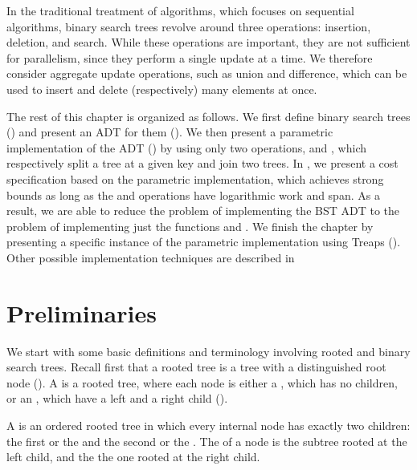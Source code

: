 \begin{chapter}
In the traditional treatment of algorithms, which focuses on
sequential algorithms, binary search trees revolve around three
operations: insertion, deletion, and search.
%
While these operations are important, they are not sufficient for
parallelism, since they perform a single update at a time.
% 
We therefore consider aggregate update operations, such as union and
difference, which can be used to insert and delete (respectively) many
elements at once.

The rest of this chapter is organized as follows.  We first define
binary search trees ()
and present an ADT for them (). 
%
We then present a parametric implementation of the ADT
() by using only two operations, 
and , which respectively split a tree at a given key and
join two trees.
%
In , we present a cost specification based on the
parametric implementation, which achieves strong bounds as long as the
 and  operations have logarithmic work and
span.
%
As a result, we are able to reduce the problem of implementing the BST
ADT to the problem of implementing just the functions 
and .  
%
We finish the chapter by presenting a specific instance of the
parametric implementation using Treaps ().
%
Other possible implementation techniques are described in


\section{Preliminaries}
\label{sec:bst::prelim}

We start with some basic definitions and terminology involving rooted
and binary search trees.  Recall first that a rooted tree is a tree
with a distinguished root node (). 
%
A  is a rooted tree, where each node is either
a , which has no children, or an ,
which have a left and a right child ().
%
\begin{definition}
\label{def:bst::binarytree}
A  is an ordered rooted tree in which every
internal node has exactly two children: the first or the  and the second or the .  
%
The  of a node is the subtree rooted at the left
child, and the  the one rooted at the right child.
\end{definition}


\end{chapter}
